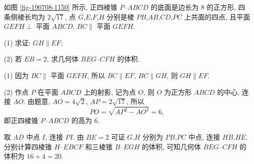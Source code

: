 \begin{exercise}
    如图 \ref{fig-190708-1150} 所示, 正四棱锥 $P\text{--}ABCD$ 的底面是边长为 $8$ 的正方形, 四条侧棱长均为 $2\sqrt{17}$, 点 $G$,$E$,$F$,$H$ 分别是棱 $PB$,$AB$,$CD$,$PC$ 上共面的四点, 且平面 $GEFH\perp$ 平面 $ABCD$, $BC\parallel$ 平面 $GEFH$.
    
    (1) 求证: $GH\parallel EF$;
    
    (2) 若 $EB=2$, 求几何体 $BEG\text{--}CFH$ 的体积.
\end{exercise}
\beginsolution
    (1) 因为 $BC\parallel$ 平面 $GEFH$, 所以 $BC\parallel EF$, $BC\parallel GH$, 则 $GH\parallel EF$.

    (2) 作点 $P$ 在平面 $ABCD$ 上的射影, 记为点 $O$, 则 $O$ 为正方形 $ABCD$ 的中心, 连接 $AO$. 由题意, $AO=4\sqrt2$, $AP= 2\sqrt{17}$, 所以
    \[PO= \sqrt{AP^2- AO^2}= 6,\]
    即正四棱锥 $P\text{--}ABCD$ 的高为 $6$.

    取 $AD$ 中点 $I$, 连接 $PI$. 由 $BE=2$ 可证 $G$,$H$ 分别为 $PB$,$PC$ 中点, 连接 $HB$,$HE$. 分别计算四棱锥 $H\text{--}EBCF$ 和三棱锥 $B\text{--}EGH$ 的体积, 可知几何体 $BEG\text{--}CFH$ 的体积为 $16+4= 20$.
\endsolution